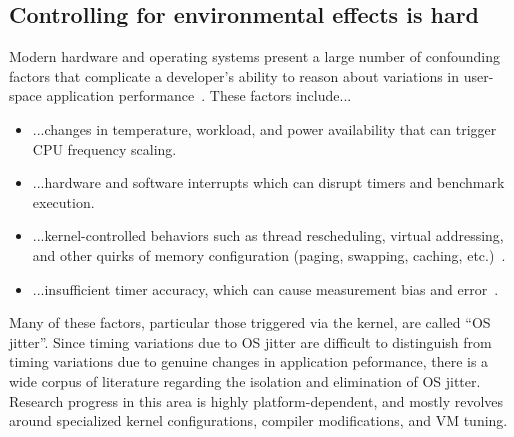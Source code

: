 \documentclass[conference]{IEEEtran}
\begin{document}
\subsection{Controlling for environmental effects is hard}

Modern hardware and operating systems present a large number of confounding factors that
complicate a developer's ability to reason about variations in user-space application
performance~\cite{HP5e}. These factors include...

\begin{itemize}
    \item ...changes in temperature, workload, and power availability that can trigger
    CPU frequency scaling.
    \item ...hardware and software interrupts which can disrupt timers and benchmark
    execution.
    \item ...kernel-controlled behaviors such as thread rescheduling, virtual addressing,
    and other quirks of memory configuration (paging, swapping, caching,
    etc.)~\cite{Oyama2014,Oyama2016}.
    \item ...insufficient timer accuracy, which can cause measurement bias and
    error~\cite{Mytkowicz2009}.
\end{itemize}

Many of these factors, particular those triggered via the kernel, are called ``OS jitter''.
Since timing variations due to OS jitter are difficult to distinguish from timing variations
due to genuine changes in application peformance, there is a wide corpus of literature
regarding the isolation and elimination of OS jitter. Research progress in this area is
highly platform-dependent, and mostly revolves around specialized kernel configurations,
compiler modifications, and VM tuning.

\end{document}
